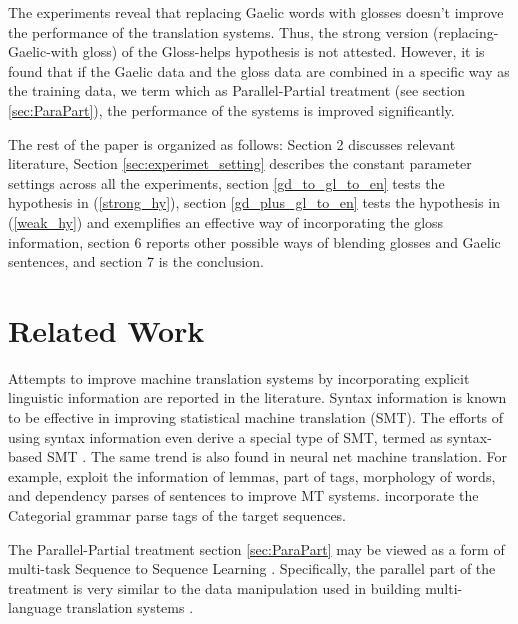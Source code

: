 \documentclass[a4paper]{article}
\begin{document}
The experiments reveal that replacing Gaelic words with glosses doesn't improve the performance of the translation systems. Thus, the strong version (replacing-Gaelic-with gloss) of the Gloss-helps hypothesis is not attested. However, it is found that if the Gaelic data and the gloss data are combined in a specific way as the training data, we term which as Parallel-Partial treatment (see section \ref{sec:ParaPart}), the performance of the systems is improved significantly. 

The rest of the paper is organized as follows: Section 2 discusses relevant literature, Section \ref{sec:experimet_setting} describes the constant parameter settings across all the experiments, section \ref{gd_to_gl_to_en} tests the hypothesis in (\ref{strong_hy}), section \ref{gd_plus_gl_to_en} tests the hypothesis in (\ref{weak_hy}) and exemplifies an effective way of incorporating the gloss information, section 6 reports other possible ways of blending glosses and Gaelic sentences, and section 7 is the conclusion. 

\section{Related Work}\label{relate_work}
Attempts to improve machine translation systems by incorporating explicit linguistic information are reported in the literature. Syntax information is known to be effective in improving statistical machine translation (SMT). The efforts of using syntax information even derive a special type of SMT, termed as syntax-based SMT \citep{williams2016syntax}. The same trend is also found in neural net machine translation. For example, \citet{sennrich2016linguistic} exploit the information of lemmas, part of tags, morphology of words, and dependency parses of sentences to improve MT systems. \citet{ccg_target_seq} incorporate the Categorial grammar parse tags of the target sequences.

The Parallel-Partial treatment section \ref{sec:ParaPart} may be viewed as a form of multi-task Sequence to Sequence Learning \citep{luong2015multi}. Specifically, the parallel part of the treatment is very similar to the data manipulation used in building multi-language translation systems \citep{google_zero_shot}.  

\end{document}
